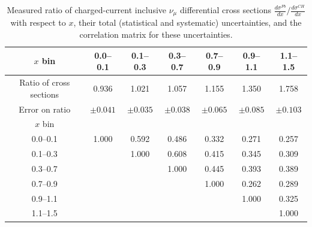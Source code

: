 \documentclass[aps,preprint,showpacs,superscriptaddress]{revtex4} %
\newcommand{\numu}{\ensuremath{\nu_{\mu}}\xspace}
\newcommand{\Xbj}{\ensuremath{x}\xspace}
\begin{document}
\begingroup
\squeezetable
\begin{table}
  \begin{tabular}{c|cccccc}
    \hline \hline
    \Xbj bin & 0.0--0.1 & 0.1--0.3 & 0.3--0.7 & 0.7--0.9 & 0.9--1.1 & 1.1--1.5 \\ 
    \hline
    Ratio of cross sections & 0.936 & 1.021 & 1.057 & 1.155 & 1.350 & 1.758 \\ 
    Error on ratio & $ \pm 0.041 $ & $ \pm 0.035 $ & $ \pm 0.038 $ & $ \pm 0.065 $ & $ \pm 0.085 $ & $ \pm 0.103 $ \\ 
    \hline
    \Xbj bin &  &  &  &  &  &  \\ 
    0.0--0.1 & 1.000 & 0.592 & 0.486 & 0.332 & 0.271 & 0.257 \\ 
    0.1--0.3 &  & 1.000 & 0.608 & 0.415 & 0.345 & 0.309 \\ 
    0.3--0.7 &  &  & 1.000 & 0.445 & 0.393 & 0.389 \\ 
    0.7--0.9 &  &  &  & 1.000 & 0.262 & 0.289 \\ 
    0.9--1.1 &  &  &  &  & 1.000 & 0.325 \\ 
    1.1--1.5 &  &  &  &  &  & 1.000 \\ 
    \hline \hline
  \end{tabular}
  \caption{Measured ratio of charged-current inclusive \numu differential cross sections $\frac{d\sigma^{Pb}}{d\Xbj}/\frac{d\sigma^{CH}}{d\Xbj}$ with respect to \Xbj, their total (statistical and systematic) uncertainties, and the correlation matrix for these uncertainties.}
  \label{tab:x_ratio_82_93_results_table}
\end{table}
\endgroup
\end{document}
